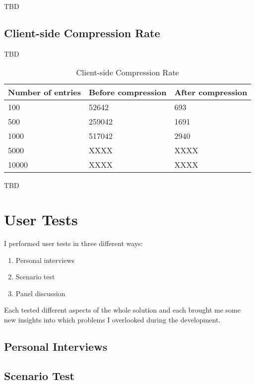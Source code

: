 TBD

\subsection{Client-side Compression Rate}

TBD

\begin{table}[!ht]
\begin{center}
\begin{tabular}{|l|l|l|}
\hline
\textbf{Number of entries} & \textbf{Before compression} & \textbf{After compression} \\
\hline
100 & 52642 & 693 \\
\hline
500 & 259042 & 1691 \\
\hline
1000 & 517042 & 2940 \\
\hline
5000 & XXXX & XXXX \\
\hline
10000 & XXXX & XXXX \\
\hline
\end{tabular}
\end{center}
\caption{Client-side Compression Rate}
\label{tab:ex_db}
\end{table}

TBD

\section{User Tests}

I performed user tests in three different ways:

\begin{enumerate}
	\item Personal interviews
	\item Scenario test
	\item Panel discussion
\end{enumerate}

Each tested different aspects of the whole solution and each brought me some new insights into which problems I overlooked during the development.

\subsection{Personal Interviews}

\subsection{Scenario Test}

